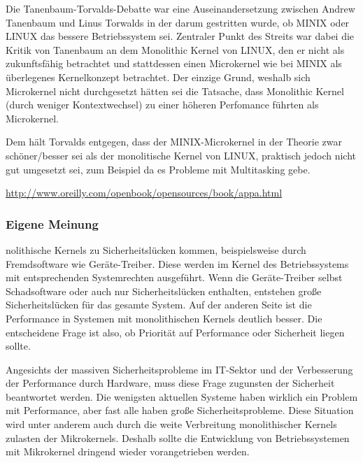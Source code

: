 \documentclass[numbers=noendperiod]{scrartcl}
\begin{document}
Die Tanenbaum-Torvalds-Debatte war eine Auseinandersetzung zwischen Andrew Tanenbaum und Linus Torwalds in der darum gestritten wurde, ob MINIX oder LINUX das bessere Betriebssystem sei. Zentraler Punkt des Streits war dabei die Kritik von Tanenbaum an dem Monolithic Kernel von LINUX, den er nicht als zukunftsfähig betrachtet und stattdessen einen Microkernel wie bei MINIX als überlegenes Kernelkonzept betrachtet. Der einzige Grund, weshalb sich Microkernel nicht durchgesetzt hätten sei die Tatsache, dass Monolithic Kernel (durch weniger Kontextwechsel) zu einer höheren Perfomance führten als Microkernel.

Dem hält Torvalds entgegen, dass der MINIX-Microkernel in der Theorie zwar schöner/besser sei als der monolitische Kernel von LINUX, praktisch jedoch nicht gut umgesetzt sei, zum Beispiel da es Probleme mit Multitasking gebe.


\url{http://www.oreilly.com/openbook/opensources/book/appa.html}
\subsubsection*{Eigene Meinung}
nolithische Kernels zu Sicherheitslücken kommen, beispielsweise durch Fremdsoftware wie Geräte-Treiber. Diese werden im Kernel des Betriebssystems mit entsprechenden Systemrechten ausgeführt. Wenn die Geräte-Treiber selbst Schadsoftware oder auch nur Sicherheitslücken enthalten, entstehen große Sicherheitslücken für das gesamte System. Auf der anderen Seite ist die Performance in Systemen mit monolithischen Kernels deutlich besser. Die entscheidene Frage ist also, ob Priorität auf Performance oder Sicherheit liegen sollte. 

	Angesichts der massiven Sicherheitsprobleme im IT-Sektor und der Verbesserung der Performance durch Hardware, muss diese Frage zugunsten der Sicherheit beantwortet werden. Die wenigsten aktuellen Systeme haben wirklich ein Problem mit Performance, aber fast alle haben große Sicherheitsprobleme. Diese Situation wird unter anderem auch durch die weite Verbreitung monolithischer Kernels zulasten der Mikrokernels. Deshalb sollte die Entwicklung von Betriebssystemen mit Mikrokernel dringend wieder vorangetrieben werden.
\end{document}
